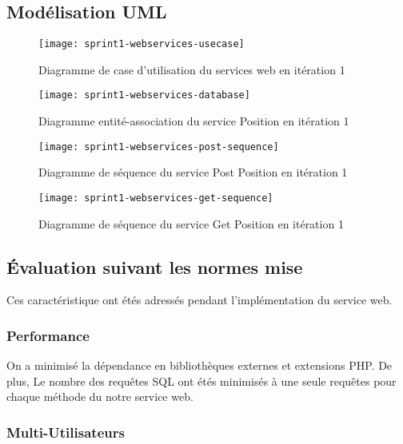 \subsection{Modélisation UML}

\begin{figure}[htbp]
  \centering
  \texttt{[image: sprint1-webservices-usecase]}
  \caption{Diagramme de case d'utilisation du services web en itération 1}
  \label{fig:sprint1-webservices-usecase}
\end{figure}

\begin{figure}[htbp]
    \centering
    \texttt{[image: sprint1-webservices-database]}
    \caption{Diagramme entité-association du service Position en itération 1}
\end{figure}

\begin{figure}[htbp]
  \centering
  \texttt{[image: sprint1-webservices-post-sequence]}
  \caption{Diagramme de séquence du service Post Position en itération 1}
  \label{fig:sprint1-webservices-post-sequence}
\end{figure}

\begin{figure}[htbp]
  \centering
  \texttt{[image: sprint1-webservices-get-sequence]}
  \caption{Diagramme de séquence du service Get Position en itération 1}
  \label{fig:sprint1-webservices-get-sequence}
\end{figure}

\subsection{Évaluation suivant les normes mise}
Ces caractéristique ont étés adressés pendant l'implémentation du service web.

\subsubsection{Performance}

On a minimisé la dépendance en bibliothèques externes et extensions PHP\@. De
plus, Le nombre des requêtes SQL ont étés minimisés à une seule requêtes pour
chaque méthode du notre service web.

\subsubsection{Multi-Utilisateurs}

